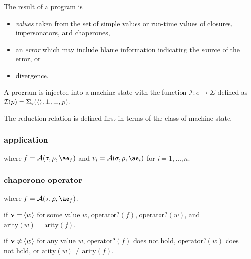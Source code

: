\documentclass{sigplanconf}
\begin{document}
The result of a program is
\begin{itemize}
\item \emph{values} taken from the set of simple values or run-time values of closures, impersonators, and chaperones,
\item an \emph{error} which may include blame information indicating the source of the error, or
\item divergence.
\end{itemize}

A program is injected into a machine state with the function $\mathcal{I} : e\rightarrow\Sigma$ defined as $\mathcal{I}(p)=\Sigma_e(\langle\rangle,\perp,\perp,p)$.

The reduction relation is defined first in terms of the class of machine state.

\subsubsection{application}

\noindent
{}

\noindent
where $f=\A{\sigma}{\rho}{\ae_f}$ and $v_i=\A{\sigma}{\rho}{\ae_i}$ for $i=1,\dots,n$.

\subsubsection{chaperone-operator}

\noindent
{}

\noindent
where $f=\A{\sigma}{\rho}{\ae_f}$.

\noindent
{}

\noindent
if $\mathbf{v}=\langle w\rangle$ for some value $w$, $\mathrm{operator?}(f)$, $\mathrm{operator?}(w)$, and $\mathrm{arity}(w)=\mathrm{arity}(f)$.

\noindent
{}

\noindent
if $\mathbf{v}\ne\langle w\rangle$ for any value $w$, $\mathrm{operator?}(f)$ does not hold, $\mathrm{operator?}(w)$ does not hold, or $\mathrm{arity}(w)\ne\mathrm{arity}(f)$.
\end{document}
